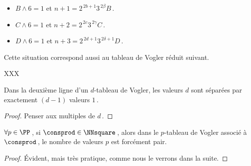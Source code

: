 \begin{example}
\begin{multicols}{2}
\begin{itemize}
		\item $B \wedge 6 = 1$
		      et
		      $n + 1 = 2^{\,2b+1} 3^{\,2\beta}    B$\,.

		\item $C \wedge 6 = 1$
		      et
		      $n + 2 = 2^{\,2c}   3^{\,2\gamma}   C$\,.

		\item $D \wedge 6 = 1$
		      et
		      $n + 3 = 2^{\,2d+1} 3^{\,2\delta+1} D$\,.
	\end{itemize}
	\end{multicols}
	
	Cette situation correspond aussi au tableau de Vogler réduit suivant.

	XXX
\end{example}




\begin{fact} \label{vogler-multiple}
	Dans la deuxième ligne d'un $d$-tableau de Vogler, les valeurs $d$ sont séparées par exactement $(d-1)$ valeurs $1$\,.
\end{fact}


\begin{proof}
	Penser aux multiples de $d$\,.
\end{proof}




\begin{fact} \label{vogler-parity-square}
	$\forall p \in \PP$\,, si $\consprod \in \NNsquare$\,, alors dans le $p$-tableau de Vogler associé à $\consprod$\,, le nombre de valeurs $p$ est forcément pair.
\end{fact}


\begin{proof}
	Évident, mais très pratique, comme nous le verrons dans la suite.
\end{proof}

